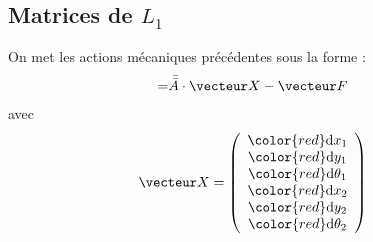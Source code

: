 \documentclass[a4paper,10pt]{article}
\renewcommand{\dx}[1]  {\ensuremath{{\color{red}\text{d}x_{#1}}}}
\renewcommand{\dy}[1]  {\ensuremath{{\color{red}\text{d}y_{#1}}}}
\renewcommand{\dtheta}[1]  {\ensuremath{{\color{red}\text{d}\theta_{#1}}}}
\begin{document}
    
	\subsection{Matrices de $L_1$}
	On met les actions mécaniques précédentes sous la forme :
        \begin{align}
                                =&\bar {\bar A}\cdot \vecteur X-\vecteur F
        \end{align}
avec
    \begin{align*}
        \vecteur X  &=  \left(
                            \begin{array}{c}
                                \dx1\\\dy1\\\dtheta1\\\dx2\\\dy2\\\dtheta2
                            \end{array}
                        \right)
    \end{align*}
\end{document}
